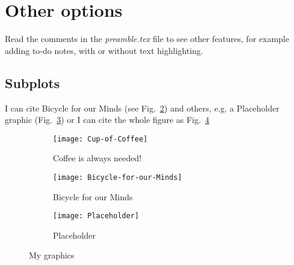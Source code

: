 \section{Other options}

Read the comments in the \textit{preamble.tex} file to see other features, for example adding to-do notes, with or without text highlighting.

\begin{landscape}

\section*{Subplots}
I can cite Bicycle for our Minds (see Fig.~\ref{fig:Bicycle-for-our-Minds}) and others, e.g. a Placeholder graphic (Fig.~\ref{fig:aPlaceholder}) or I can cite the whole figure as Fig.~\ref{fig:myGraphics}

\begin{figure}
  \centering
  \begin{subfigure}[b]{0.3\textwidth}
    \texttt{[image: Cup-of-Coffee]}
    \caption{Coffee is always needed!}
    \label{fig:Cup-of-Coffee}   
  \end{subfigure}             
  \begin{subfigure}[b]{0.3\textwidth}
    \texttt{[image: Bicycle-for-our-Minds]}
    \caption{Bicycle for our Minds}
    \label{fig:Bicycle-for-our-Minds}
  \end{subfigure}             
  \begin{subfigure}[b]{0.3\textwidth}
    \texttt{[image: Placeholder]}
    \caption{Placeholder}
    \label{fig:aPlaceholder}
  \end{subfigure}
  \caption{My graphics}
  \label{fig:myGraphics}
\end{figure}

\end{landscape}
